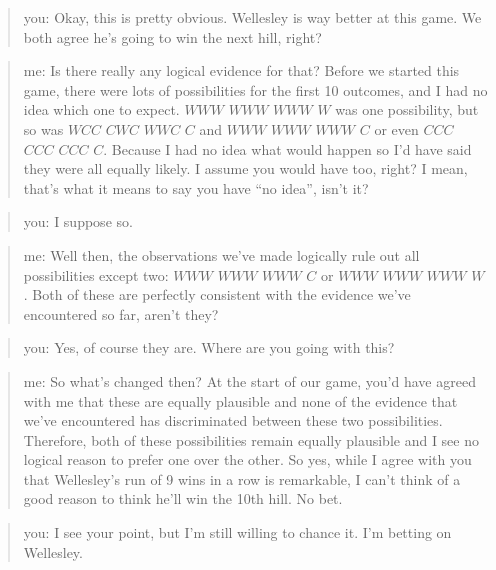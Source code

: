 \documentclass[
  a4paper,
]{book}
\begin{document}
\begin{quote}
you: Okay, this is pretty obvious. Wellesley is way better at this game.
We both agree he's going to win the next hill, right?
\end{quote}

\begin{quote}
me: Is there really any logical evidence for that? Before we started
this game, there were lots of possibilities for the first 10 outcomes,
and I had no idea which one to expect. \(WWW\) \(WWW\) \(WWW\) \(W\) was
one possibility, but so was \(WCC\) \(CWC\) \(WWC\) \(C\) and \(WWW\)
\(WWW\) \(WWW\) \(C\) or even \(CCC\) \(CCC\) \(CCC\) \(C\). Because I
had no idea what would happen so I'd have said they were all equally
likely. I assume you would have too, right? I mean, that's what it means
to say you have ``no idea'', isn't it?
\end{quote}

\begin{quote}
you: I suppose so.
\end{quote}

\begin{quote}
me: Well then, the observations we've made logically rule out all
possibilities except two: \(WWW\) \(WWW\) \(WWW\) \(C\) or \(WWW\)
\(WWW\) \(WWW\) \(W\). Both of these are perfectly consistent with the
evidence we've encountered so far, aren't they?
\end{quote}

\begin{quote}
you: Yes, of course they are. Where are you going with this?
\end{quote}

\begin{quote}
me: So what's changed then? At the start of our game, you'd have agreed
with me that these are equally plausible and none of the evidence that
we've encountered has discriminated between these two possibilities.
Therefore, both of these possibilities remain equally plausible and I
see no logical reason to prefer one over the other. So yes, while I
agree with you that Wellesley's run of 9 wins in a row is remarkable, I
can't think of a good reason to think he'll win the 10th hill. No bet.
\end{quote}

\begin{quote}
you: I see your point, but I'm still willing to chance it. I'm betting
on Wellesley.
\end{quote}
\end{document}
